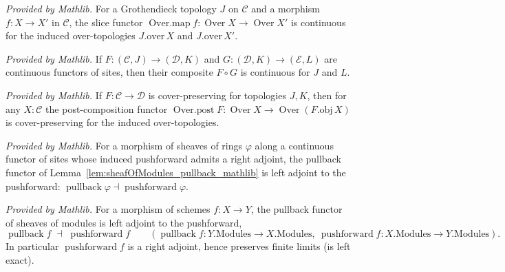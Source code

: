 \begin{lemma}
  \label{lem:instIsContinuousOverMapOver_mathlib}
  \mathlibok
  \textit{Provided by Mathlib.}
  For a Grothendieck topology \(J\) on \(\mathcal{C}\) and a morphism \(f : X \to X'\) in
  \(\mathcal{C}\), the slice functor \(\operatorname{Over.map} f : \operatorname{Over} X \to
  \operatorname{Over} X'\) is continuous for the induced over-topologies \(J.\mathrm{over}\,X\) and
  \(J.\mathrm{over}\,X'\).
\end{lemma}

\begin{lemma}
  \label{lem:functor_isContinuous_comp_mathlib}
  \mathlibok
  \textit{Provided by Mathlib.}
  If \(F : (\mathcal{C}, J) \to (\mathcal{D}, K)\) and \(G : (\mathcal{D}, K) \to (\mathcal{E}, L)\)
  are continuous functors of sites, then their composite \(F \circ G\) is continuous for \(J\) and
  \(L\).
\end{lemma}

\begin{lemma}
  \label{lem:coverPreserving_overPost_mathlib}
  \mathlibok
  \textit{Provided by Mathlib.}
  If \(F : \mathcal{C} \to \mathcal{D}\) is cover-preserving for topologies \(J, K\), then for any
  \(X : \mathcal{C}\) the post-composition functor \(\operatorname{Over.post} F : \operatorname{Over} X
  \to \operatorname{Over}(F.\mathrm{obj}\, X)\) is cover-preserving for the induced over-topologies.
\end{lemma}

\begin{lemma}
  \label{lem:pullbackPushforwardAdjunction_mathlib}
  \mathlibok
  \textit{Provided by Mathlib.}
  For a morphism of sheaves of rings \(\varphi\) along a continuous functor of sites whose induced
  pushforward admits a right adjoint, the pullback functor of
  Lemma~\ref{lem:sheafOfModules_pullback_mathlib} is left adjoint to the pushforward:
  \(\operatorname{pullback}\varphi \dashv \operatorname{pushforward}\varphi\).
\end{lemma}

\begin{lemma}
  \label{lem:scheme_pullbackPushforwardAdjunction_mathlib}
  \mathlibok
  \textit{Provided by Mathlib.}
  For a morphism of schemes \(f : X \to Y\), the pullback functor of sheaves of modules is left
  adjoint to the pushforward,
  \[
    \operatorname{pullback} f \;\dashv\; \operatorname{pushforward} f
    \qquad (\operatorname{pullback} f : Y.\mathrm{Modules} \to X.\mathrm{Modules},\
      \operatorname{pushforward} f : X.\mathrm{Modules} \to Y.\mathrm{Modules}).
  \]
  In particular \(\operatorname{pushforward} f\) is a right adjoint, hence preserves finite limits
  (is left exact).
\end{lemma}

